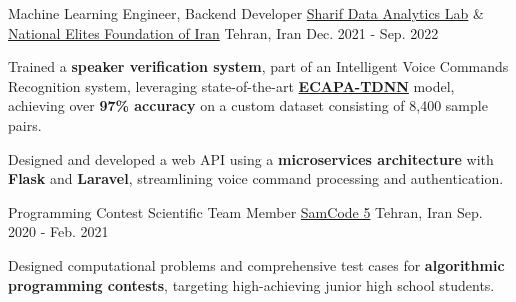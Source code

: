 \begin{cventries}
  \cventry
    {Machine Learning Engineer, Backend Developer} %
    {\href{https://www.sharif.edu/}{Sharif Data Analytics Lab} \& \href{https://en.bmn.ir/}{National Elites Foundation of Iran}} %
    {Tehran, Iran} %
    {Dec. 2021 - Sep. 2022} %
    {
      \begin{cvitems} %
        \item{Trained a \textbf{speaker verification system}, part of an Intelligent Voice Commands Recognition system, leveraging state-of-the-art \href{https://arxiv.org/abs/2104.01466}{\textbf{ECAPA-TDNN}} model, achieving over \textbf{97\% accuracy} on a custom dataset consisting of 8,400 sample pairs.}
        \item{Designed and developed a web API using a \textbf{microservices architecture} with \textbf{Flask} and \textbf{Laravel}, streamlining voice command processing and authentication.}
      \end{cvitems}
    }

  \cventry
    {Programming Contest Scientific Team Member} %
    {\href{https://samcode.allamehelli3.ir/staff.html}{SamCode 5}} %
    {Tehran, Iran} %
    {Sep. 2020 - Feb. 2021} %
    {
      \begin{cvitems} %
        \item{Designed computational problems and comprehensive test cases for \textbf{algorithmic programming contests}, targeting high-achieving junior high school students.}
      \end{cvitems}
    }


\end{cventries}
